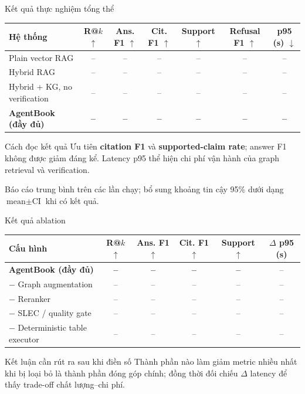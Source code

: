 \documentclass[aspectratio=169,11pt]{beamer}
\newcommand{\keyword}[1]{\textcolor{ABBlue}{\textbf{#1}}}
\begin{document}
\begin{frame}{Kết quả thực nghiệm tổng thể}
\scriptsize
\begin{table}
\centering
\setlength{\tabcolsep}{3.4pt}
\begin{tabular}{L{0.25\textwidth}cccccc}
\toprule
\textbf{Hệ thống} & \textbf{R@$k$ $\uparrow$} & \textbf{Ans. F1 $\uparrow$} & \textbf{Cit. F1 $\uparrow$} & \textbf{Support $\uparrow$} & \textbf{Refusal F1 $\uparrow$} & \textbf{p95 (s) $\downarrow$} \\
\midrule
Plain vector RAG             & -- & -- & -- & -- & -- & -- \\
Hybrid RAG                   & -- & -- & -- & -- & -- & -- \\
Hybrid + KG, no verification & -- & -- & -- & -- & -- & -- \\
\textbf{AgentBook (đầy đủ)}  & \textbf{--} & \textbf{--} & \textbf{--} & \textbf{--} & \textbf{--} & \textbf{--} \\
\bottomrule
\end{tabular}
\end{table}
\vspace{0.18cm}
\begin{block}{Cách đọc kết quả}
Ưu tiên \keyword{citation F1} và \keyword{supported-claim rate}; answer F1 không được giảm đáng kể. Latency p95 thể hiện chi phí vận hành của graph retrieval và verification.
\end{block}
\vspace{0.08cm}
{\tiny Báo cáo trung bình trên các lần chạy; bổ sung khoảng tin cậy 95\% dưới dạng $\text{mean}\pm\text{CI}$ khi có kết quả.}
\end{frame}

\begin{frame}{Kết quả ablation}
\scriptsize
\begin{table}
\centering
\setlength{\tabcolsep}{4.5pt}
\begin{tabular}{L{0.31\textwidth}ccccc}
\toprule
\textbf{Cấu hình} & \textbf{R@$k$ $\uparrow$} & \textbf{Ans. F1 $\uparrow$} & \textbf{Cit. F1 $\uparrow$} & \textbf{Support $\uparrow$} & \textbf{$\Delta$ p95 (s)} \\
\midrule
\textbf{AgentBook (đầy đủ)}       & \textbf{--} & \textbf{--} & \textbf{--} & \textbf{--} & -- \\
$-$ Graph augmentation             & -- & -- & -- & -- & -- \\
$-$ Reranker                       & -- & -- & -- & -- & -- \\
$-$ SLEC / quality gate            & -- & -- & -- & -- & -- \\
$-$ Deterministic table executor   & -- & -- & -- & -- & -- \\
\bottomrule
\end{tabular}
\end{table}
\vspace{0.18cm}
\begin{block}{Kết luận cần rút ra sau khi điền số}
Thành phần nào làm giảm metric nhiều nhất khi bị loại bỏ là thành phần đóng góp chính; đồng thời đối chiếu $\Delta$ latency để thấy trade-off chất lượng--chi phí.
\end{block}
\end{frame}
\end{document}

